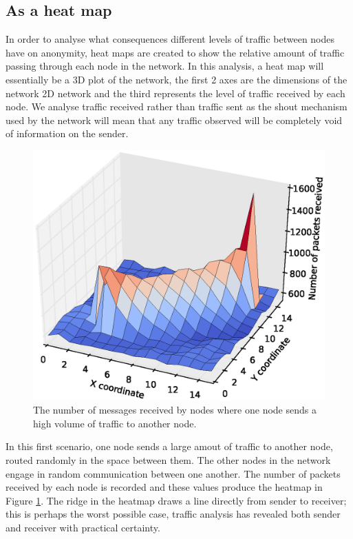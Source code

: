 \documentclass[ %
                    author={Luke Murray},
                supervisor={Dr. Simon Hollis},
                     title={Shadow Peer-to-Peer Networks},
                  subtitle={},
                    degree={MEng},
                      year={2013} ]{thesis}
\begin{document}
\subsection{As a heat map}

In order to analyse what consequences different levels of traffic between nodes have on anonymity, heat maps are created to show the relative amount of traffic passing through each node in the network. In this analysis, a heat map will essentially be a 3D plot of the network, the first 2 axes are the dimensions of the network 2D network and the third represents the level of traffic received by each node. We analyse traffic received rather than traffic sent as the shout mechanism used by the network will mean that any traffic observed will be completely void of information on the sender.

\begin{figure}[h]
    \centering
    \includegraphics{diagrams/heat_map_random.eps}
    \caption{The number of messages received by nodes where one node sends a high volume of traffic to another node.}
    \label{heatmap_random}
\end{figure}

In this first scenario, one node sends a large amout of traffic to another node, routed randomly in the space between them. The other nodes in the network engage in random communication between one another. The number of packets received by each node is recorded and these values produce the heatmap in Figure \ref{heatmap_random}. The ridge in the heatmap draws a line directly from sender to receiver; this is perhaps the worst possible case, traffic analysis has revealed both sender and receiver with practical certainty.
\end{document}
